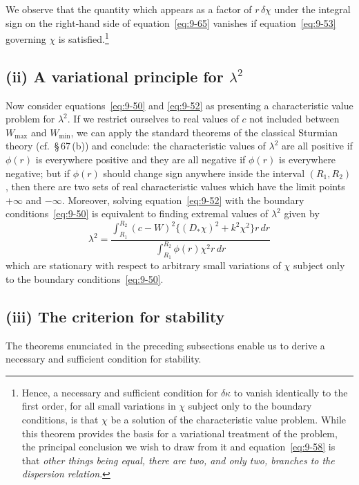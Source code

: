 We observe that the quantity which appears as a factor of $r\,\delta\chi$ under the integral sign on the right-hand side of equation~\eqref{eq:9-65} vanishes if equation~\eqref{eq:9-53} governing $\chi$ is satisfied.\footnote{Hence, a necessary and sufficient condition for $\delta\kappa$ to vanish identically to the first order, for all small variations in $\chi$ subject only to the boundary conditions, is that $\chi$ be a solution of the characteristic value problem. While this theorem provides the basis for a variational treatment of the problem, the principal conclusion we wish to draw from it and equation~\eqref{eq:9-58} is that \emph{other things being equal, there are two, and only two, branches to the dispersion relation}.}

\subsection*{(ii) A variational principle for $\lambda^2$}

Now consider equations~\eqref{eq:9-50} and \eqref{eq:9-52} as presenting a characteristic value problem for $\lambda^2$. If we restrict ourselves to real values of $c$ not included between $W_\mathrm{max}$ and $W_\mathrm{min}$, we can apply the standard theorems of the classical Sturmian theory (cf.\ \S\,67\,(b)) and conclude: the characteristic values of $\lambda^2$ are all positive if $\phi(r)$ is everywhere positive and they are all negative if $\phi(r)$ is everywhere negative; but if $\phi(r)$ should change sign anywhere inside the interval $(R_1, R_2)$, then there are two sets of real characteristic values which have the limit points $+\infty$ and $-\infty$. Moreover, solving equation~\eqref{eq:9-52} with the boundary conditions~\eqref{eq:9-50} is equivalent to finding extremal values of $\lambda^2$ given by
\begin{equation}
\lambda^2 = \frac{\displaystyle\int_{R_1}^{R_2} (c - W)^2\{(D_*\chi)^2 + k^2\chi^2\}r\, dr}{\displaystyle\int_{R_1}^{R_2} \phi(r)\chi^2 r\, dr} \label{eq:9-66}
\end{equation}
which are stationary with respect to arbitrary small variations of $\chi$ subject only to the boundary conditions~\eqref{eq:9-50}.

\subsection*{(iii) The criterion for stability}

The theorems enunciated in the preceding subsections enable us to derive a necessary and sufficient condition for stability.

